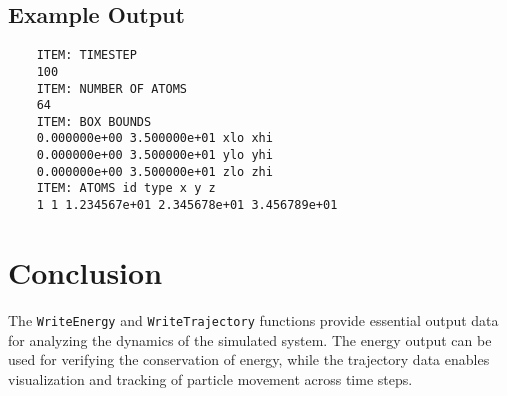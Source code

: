 \documentclass[12pt, ngerman]{report}
\begin{document}
\subsection*{Example Output}
\begin{verbatim}
	ITEM: TIMESTEP 
	100 
	ITEM: NUMBER OF ATOMS 
	64 
	ITEM: BOX BOUNDS 
	0.000000e+00 3.500000e+01 xlo xhi 
	0.000000e+00 3.500000e+01 ylo yhi 
	0.000000e+00 3.500000e+01 zlo zhi 
	ITEM: ATOMS id type x y z 
	1 1 1.234567e+01 2.345678e+01 3.456789e+01 
\end{verbatim}

\section{Conclusion}
The \texttt{WriteEnergy} and \texttt{WriteTrajectory} functions provide essential output data for analyzing the dynamics of the simulated system. The energy output can be used for verifying the conservation of energy, while the trajectory data enables visualization and tracking of particle movement across time steps.
\end{document}
